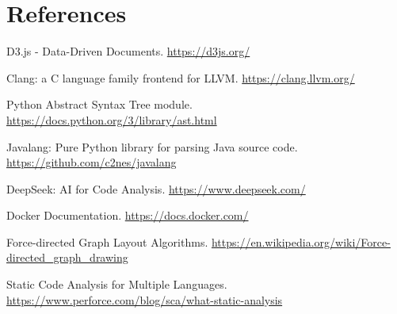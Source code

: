 \documentclass[10pt,twocolumn]{article}
\begin{document}
\section*{References}
\begin{enumerate}[label={[R\arabic*]}]
    \item D3.js - Data-Driven Documents. \url{https://d3js.org/}
    \item Clang: a C language family frontend for LLVM. \url{https://clang.llvm.org/}
    \item Python Abstract Syntax Tree module. \url{https://docs.python.org/3/library/ast.html}
    \item Javalang: Pure Python library for parsing Java source code. \url{https://github.com/c2nes/javalang}
    \item DeepSeek: AI for Code Analysis. \url{https://www.deepseek.com/}
    \item Docker Documentation. \url{https://docs.docker.com/}
    \item Force-directed Graph Layout Algorithms. \url{https://en.wikipedia.org/wiki/Force-directed_graph_drawing}
    \item Static Code Analysis for Multiple Languages. \url{https://www.perforce.com/blog/sca/what-static-analysis}
\end{enumerate}
\end{document}
